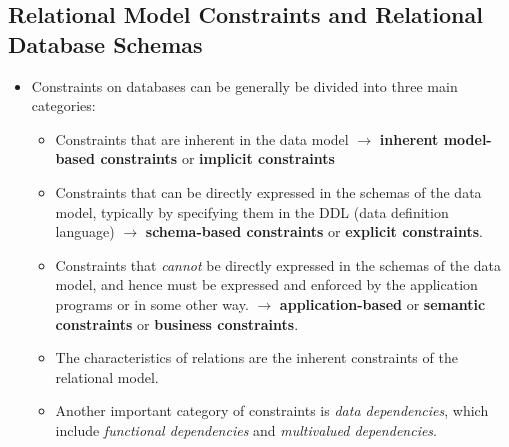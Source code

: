 \documentclass[10pt]{article}
\newcommand{\tf}{\textbf}
\newcommand{\ti}{\textit}
\begin{document}
\subsection{Relational Model Constraints and Relational Database Schemas}

\begin{itemize}
	\item Constraints on databases can be generally be divided into three main categories:
	\begin{itemize}
		\item Constraints that are inherent in the data model $\rightarrow$ \tf{inherent model-based constraints} or \tf{implicit constraints}
		\item Constraints that can be directly expressed in the schemas of the data model, typically by specifying them in the DDL (data definition language) $\rightarrow$ \tf{schema-based constraints} or \tf{explicit constraints}.
		\item Constraints that \ti{cannot} be directly expressed in the schemas of the data model, and hence must be expressed and enforced by the application programs or in some other way. $\rightarrow$ \tf{application-based} or \tf{semantic constraints} or \tf{business constraints}.

		\item The characteristics of relations are the inherent constraints of the relational model.
		\item Another important category of constraints is \ti{data dependencies}, which include \ti{functional dependencies} and \ti{multivalued dependencies}.
	\end{itemize}
\end{itemize}
\end{document}
